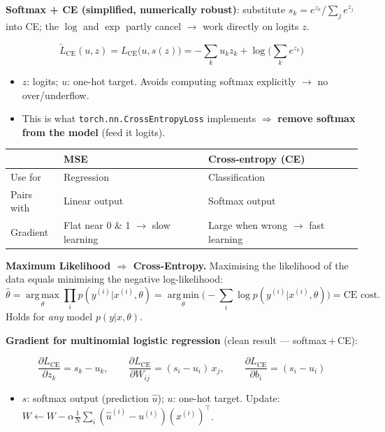 \documentclass[10pt,a4paper]{article}
\begin{document}
	\textbf{Softmax + CE (simplified, numerically robust)}: substitute $s_k=e^{z_k}/\sum_j e^{z_j}$ into CE; the $\log$ and $\exp$ partly cancel $\rightarrow$ work directly on logits $z$.
	\begin{formulabox}
		\[
		\tilde L_{\mathrm{CE}}(u,z)=L_{\mathrm{CE}}\big(u,s(z)\big)=-\sum_k u_k z_k + \log\!\Big(\sum_k e^{z_k}\Big)
		\]
	\end{formulabox}
	\begin{itemize}[leftmargin=*]
		\item $z$: logits; \quad $u$: one-hot target. Avoids computing softmax explicitly $\rightarrow$ no over/underflow.
		\item This is what \texttt{torch.nn.CrossEntropyLoss} implements $\Rightarrow$ \textbf{remove softmax from the model} (feed it logits).
	\end{itemize}

	\begin{center}
		\begin{tabular}{p{3.2cm} p{5.4cm} p{6cm}}
			\toprule
			& \textbf{MSE} & \textbf{Cross-entropy (CE)} \\
			\midrule
			Use for     & Regression & Classification \\
			Pairs with  & Linear output & Softmax output \\
			Gradient    & Flat near 0 \& 1 $\rightarrow$ slow learning & Large when wrong $\rightarrow$ fast learning \\
			\bottomrule
		\end{tabular}
	\end{center}

	\begin{importantbox}
		\textbf{Maximum Likelihood $\Rightarrow$ Cross-Entropy.} Maximising the likelihood of the data equals minimising the negative log-likelihood:
		\[
		\hat\theta=\operatorname*{arg\,max}_\theta\prod_i p(y^{(i)}|x^{(i)},\theta)
		=\operatorname*{arg\,min}_\theta\Big(\!-\!\sum_i \log p(y^{(i)}|x^{(i)},\theta)\Big)=\text{CE cost.}
		\]
		Holds for \emph{any} model $p(y|x,\theta)$.
	\end{importantbox}

	\textbf{Gradient for multinomial logistic regression} (clean result --- softmax\,+\,CE):
	\begin{formulabox}
		\[
		\frac{\partial L_{\mathrm{CE}}}{\partial z_k}=s_k-u_k,
		\qquad
		\frac{\partial L_{\mathrm{CE}}}{\partial W_{ij}}=(s_i-u_i)\,x_j,
		\qquad
		\frac{\partial L_{\mathrm{CE}}}{\partial b_i}=(s_i-u_i)
		\]
	\end{formulabox}
	\begin{itemize}[leftmargin=*]
		\item $s$: softmax output (prediction $\hat u$); \quad $u$: one-hot target. Update: $W\!\leftarrow\!W-\alpha\frac{1}{N}\sum_i(\hat u^{(i)}-u^{(i)})(x^{(i)})^\top$.
	\end{itemize}
\end{document}
